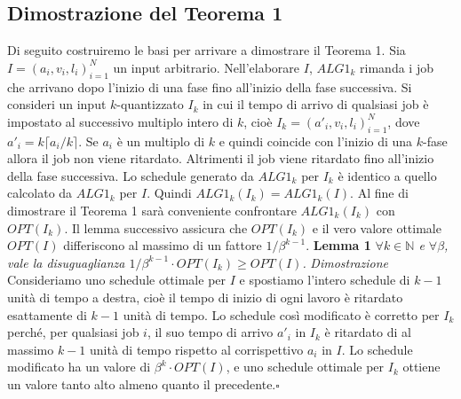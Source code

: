 \documentclass[12pt]{article}
\newcommand*{\N}{\mathbb{N}}
\begin{document}
\subsection{Dimostrazione del Teorema 1}
Di seguito costruiremo le basi per arrivare a dimostrare il Teorema 1. Sia $I=(a_{i}, v_{i}, l_{i})_{i = 1}^{N}$
un input arbitrario. Nell'elaborare $I$, $ALG1_{k}$ rimanda i job che arrivano dopo l'inizio di una fase fino all'inizio della fase successiva. Si consideri un input $k$-quantizzato $I_{k}$ in cui il tempo di arrivo di qualsiasi job è impostato al successivo multiplo intero di $k$, cioè $I_{k} = (a'_{i}, v_{i},l_{i})_{i = 1}^{N}$, dove $a'_{i} =k\lceil a_{i}/k\rceil$. Se $a_{i}$ è un multiplo di $k$ e quindi coincide con l'inizio di una $k$-fase allora il job non viene ritardato. Altrimenti il job viene ritardato fino all'inizio della fase successiva. Lo schedule generato da $ALG1_{k}$ per $I_{k}$ è identico a quello calcolato da $ALG1_{k}$ per $I$. Quindi $ALG1_{k}(I_{k}) = ALG1_{k}(I)$. Al fine di dimostrare il Teorema 1  sarà conveniente confrontare $ALG1_{k}(I_{k})$ con $OPT(I_{k})$. Il lemma successivo assicura che $OPT(I_{k})$ e il vero valore ottimale $OPT(I)$ differiscono al massimo di un fattore  $1/\beta^{k - 1}$.\newline\newline
\textbf{Lemma 1}
\textit{$\forall k \in \N$ e $\forall \beta$, vale la disuguaglianza $1/\beta^{k-1} \cdot OPT(I_{k}) \geq OPT(I)$.}\newline\newline
\textit{Dimostrazione}
Consideriamo uno schedule ottimale per $I$ e spostiamo l'intero schedule di $k - 1$ unità di tempo a destra, cioè il tempo di inizio di ogni lavoro è ritardato esattamente di $k - 1$ unità di tempo. Lo schedule così modificato è corretto per $I_{k}$ perché, per qualsiasi job $i$, il suo tempo di arrivo $a'_{i}$ in $I_{k}$ è ritardato di al massimo $k - 1$ unità di tempo rispetto al corrispettivo $a_{i}$ in $I$. Lo schedule modificato ha un valore di $\beta^{k} \cdot OPT(I)$, e uno schedule ottimale per $I_{k}$ ottiene un valore tanto alto almeno quanto il precedente.\hfill $\square$ \vspace{5mm}
\end{document}
